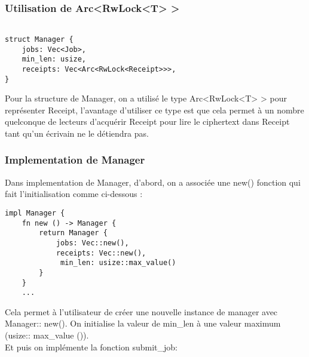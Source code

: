\documentclass{article}
\begin{document}

\subsubsection{Utilisation de Arc<RwLock<T> > }
\begin{lstlisting}

struct Manager {
    jobs: Vec<Job>,
    min_len: usize,
    receipts: Vec<Arc<RwLock<Receipt>>>,
}
\end{lstlisting}
Pour la structure de Manager, on a utilisé le type Arc<RwLock<T> > pour représenter Receipt, l'avantage d'utiliser ce type est que cela permet à un nombre quelconque de lecteurs d’acquérir Receipt pour lire le ciphertext dans Receipt tant qu’un écrivain ne le détiendra pas.\\
\subsubsection{Implementation de Manager}
Dans implementation de Manager, d'abord, on a associée une new() fonction qui fait l'initialisation comme ci-dessous : 
\begin{lstlisting}
impl Manager {
    fn new () -> Manager {
        return Manager {
            jobs: Vec::new(),
            receipts: Vec::new(),
             min_len: usize::max_value()
        }
    }
    ...
\end{lstlisting}
Cela permet à l'utilisateur de créer une nouvelle instance de manager avec Manager:: new().
On initialise la valeur de min\_len à une valeur maximum (usize:: max\_value ()).\\

Et puis on implémente la fonction submit\_job:
\end{document}
